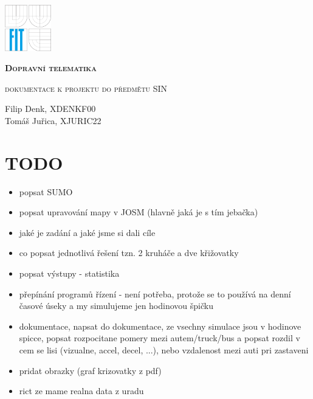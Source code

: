 \documentclass[a4paper,11pt]{article}
\begin{document}
\begin{titlepage}
	\centering
	\includegraphics[width=0.15\textwidth]{fig/fit-zp2.pdf}\par\vspace{7cm}
	{\scshape\LARGE\bfseries Dopravní telematika\par}
	\vspace{0.5cm}
	{\scshape\Large dokumentace k projektu do předmětu SIN \par}
	\vspace{1.5cm}
	{\huge\bfseries \par}
	\vspace{2cm}
	{\Large\itshape \par}
	\vspace{8cm}
	Filip Denk, XDENKF00
	\\Tomáš Juřica, XJURIC22
\end{titlepage}


\section{TODO}
\begin{itemize}
	\item popsat SUMO
	\item popsat upravování mapy v JOSM (hlavně jaká je s tím jebačka)
	\item jaké je zadání a jaké jsme si dali cíle
	\item co popsat jednotlivá řešení tzn. 2 kruháče a dve křižovatky
	\item popsat výstupy - statistika
	\item přepínání programů řízení - není potřeba, protože se to používá na denní časové úseky a my simulujeme jen hodinovou špičku
	\item dokumentace, napsat do dokumentace, ze vsechny simulace jsou v hodinove spicce, popsat rozpocitane pomery mezi autem/truck/bus a popsat rozdil v cem se lisi (vizualne, accel, decel, ...), nebo vzdalenost mezi auti pri zastaveni
	\item pridat obrazky (graf krizovatky z pdf)
	\item rict ze mame realna data z uradu
\end{itemize}
\end{document}

